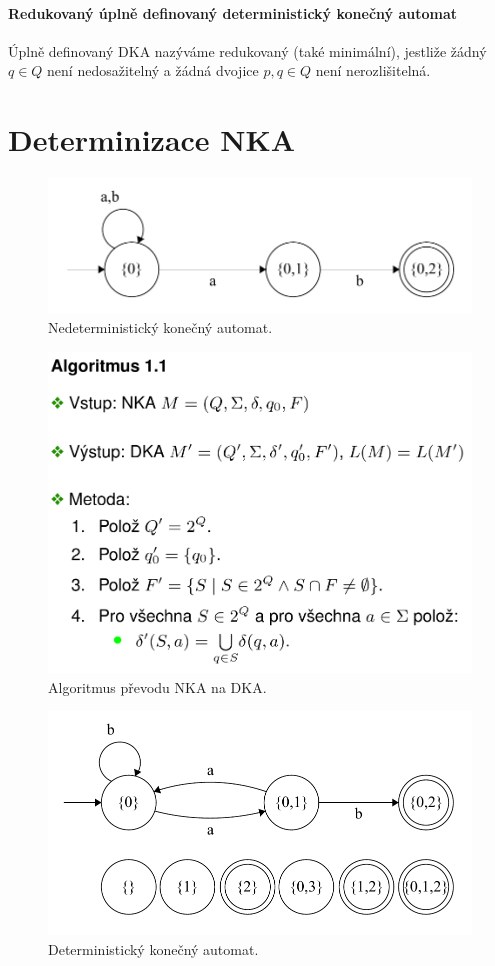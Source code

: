 \paragraph*{Redukovaný úplně definovaný deterministický konečný automat} Úplně definovaný DKA nazýváme redukovaný (také minimální), jestliže žádný $q \in Q$ není nedosažitelný a žádná dvojice $p, q \in Q$ není nerozlišitelná.


\section{Determinizace NKA}

\begin{figure}[H]
    \centering
    \includegraphics[width=0.75\linewidth]{nka.pdf}
    \caption{Nedeterministický konečný automat.}
\end{figure}

\begin{figure}[H]
    \centering
    \includegraphics[width=0.75\linewidth]{nka_to_dka.pdf}
    \caption{Algoritmus převodu NKA na DKA.}
\end{figure}

\begin{figure}[H]
    \centering
    \includegraphics[width=0.75\linewidth]{dka_uplny.pdf}
    \caption{Deterministický konečný automat.}
\end{figure}

